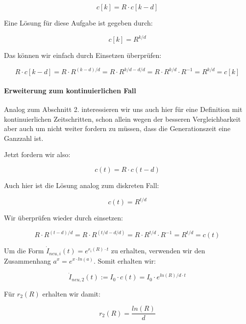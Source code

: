 \documentclass[a4paper]{article}
\begin{document}
    $$ c[k] = R \cdot c[k-d] $$

    Eine Lösung für diese Aufgabe ist gegeben durch: 

    \begin{equation}
        c[k] = R^{k/d}
    \end{equation}

    Das können wir einfach durch Einsetzen überprüfen: 

    $$ R \cdot c[k-d] = R \cdot R^{(k-d)/d} = R \cdot R^{k/d - d/d} = R \cdot R^{k/d} \cdot R^{-1} = R^{k/d} = c[k] $$

    \paragraph{Erweiterung zum kontinuierlichen Fall}Analog zum Abschnitt 2. interessieren wir uns auch hier für eine Definition mit kontinuierlichen Zeitschritten, schon allein wegen der besseren Vergleichbarkeit aber auch um nicht weiter fordern zu müssen, dass die Generationszeit eine Ganzzahl ist. 

    Jetzt fordern wir also: 

    \begin{equation}
        c(t) = R \cdot c(t-d)
    \end{equation}

    Auch hier ist die Lösung analog zum diskreten Fall: 

    \begin{equation}
        c(t) = R^{t/d}
    \end{equation}

    Wir überprüfen wieder durch einsetzen: 

    $$R \cdot R^{(t-d)/d} = R \cdot R^{(t/d - d/d)} = R \cdot R^{t/d} \cdot R^{-1} = R^{t/d} = c(t) $$

    Um die Form $\dot{I}_{neu,i}(t) = e^{r_{i}(R) \cdot t}$ zu erhalten, verwenden wir den Zusammenhang $a^x = e^{x \cdot ln(a)}$. Somit erhalten wir: 

    \begin{equation}
        \dot{I}_{neu,2}(t) := I_0 \cdot c(t) = I_0 \cdot e^{ln(R)/d \cdot t}
    \end{equation}

    Für $r_{2}(R)$ erhalten wir damit: 

    \begin{equation}
        r_{2}(R) = \frac{ln(R)}{d}
    \end{equation}

\end{document}
